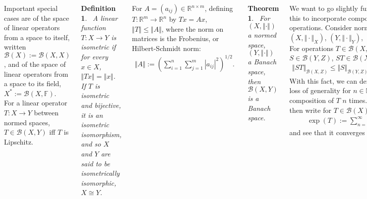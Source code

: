 \documentclass{tikzposter} %
\newtheorem{theorem}{Theorem}
\newtheorem{definition}{Definition}
\begin{document}
\begin{columns}
{    Important special cases are of the space of linear operators from a space to itself, written $\mathcal{B}(X) := \mathcal{B}(X,X)$, and of the space of linear operators from a space to its field, $X^{*} := \mathcal{B}(X, \mathbb{F})$. \\

    For a linear operator $T : X \to Y$ between normed spaces, $T \in \mathcal{B}(X,Y)$ iff $T$ is Lipschitz. \\

    \begin{definition}
    \ A linear function $T : X \to Y$ is isometric if for every $x \in X$, $\Vert Tx \Vert = \Vert x \Vert$. If $T$ is isometric and bijective, it is an isometric isomorphism, and so $X$ and $Y$ are said to be isometrically isomorphic, $X \cong Y$.
    \end{definition}
    \hphantom{}

    For $A = (a_{ij}) \in \mathbb{R}^{n \times m}$, defining $T : \mathbb{R}^{m} \to \mathbb{R}^{n}$ by $Tx = Ax$, $\Vert T \Vert \le \Vert A \Vert$, where the norm on matrices is the Frobenius, or Hilbert-Schmidt norm:
    \begin{align*}
      \Vert A \Vert := \left(\sum_{i=1}^{n} \sum_{j=1}^{m} |a_{ij}|^{2}\right)^{1/2}.
    \end{align*}

    \begin{theorem}
    \ For $(X, \Vert \cdot \Vert)$ a normed space, $(Y, \Vert \cdot \Vert)$ a Banach space, then $\mathcal{B}(X,Y)$ is a Banach space.
    \end{theorem}
    \hphantom{}

    We want to go slightly further than this to incorporate composition of operations. Consider normed spaces $(X, \Vert \cdot \Vert_{X})$, $(Y, \Vert \cdot \Vert_{Y})$, $(Z, \Vert \cdot \Vert_{Z})$. \\

    For operations $T \in \mathcal{B}(X,Y)$, $S \in \mathcal{B}(Y,Z)$, $ST \in \mathcal{B}(X,Z)$, and
    \begin{align*}
      \Vert ST \Vert_{\mathcal{B}(X,Z)} \le \Vert S \Vert_{\mathcal{B}(Y,Z)} \Vert T \Vert_{\mathcal{B}(X,Y)}.
    \end{align*}
    With this fact, we can define without loss of generality for $n \in \mathbb{N}$, $T^{n}$ as the composition of $T$ $n$ times. We can then write for $T \in \mathcal{B}(X)$,
    \begin{align*}
      \exp(T) := \sum_{n=0}^{\infty} \frac{1}{n!} T^{n},
    \end{align*}
    and see that it converges in $\mathcal{B}(X)$. \\

}
\end{columns}
\end{document}

